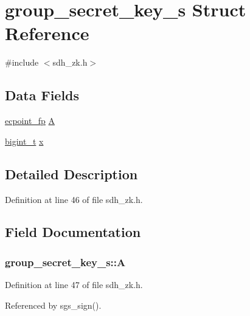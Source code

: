\hypertarget{structgroup__secret__key__s}{\section{group\-\_\-secret\-\_\-key\-\_\-s Struct Reference}
\label{structgroup__secret__key__s}
}


{\ttfamily \#include $<$sdh\-\_\-zk.\-h$>$}

\subsection*{Data Fields}
\begin{DoxyCompactItemize}
\item 
\hyperlink{structecpoint__fp}{ecpoint\-\_\-fp} \hyperlink{structgroup__secret__key__s_aca70ac18f7fc659b13b3f2d2ee66cb62}{A}
\item 
\hyperlink{types_8h_a7ae8816fa287bc4a98dec462acd2ad28}{bigint\-\_\-t} \hyperlink{structgroup__secret__key__s_a1c239f9d6501e2f14a42f7ecc56cbc1b}{x}
\end{DoxyCompactItemize}


\subsection{Detailed Description}


Definition at line 46 of file sdh\-\_\-zk.\-h.



\subsection{Field Documentation}
\hypertarget{structgroup__secret__key__s_aca70ac18f7fc659b13b3f2d2ee66cb62}{
\subsubsection[{A}]{ group\-\_\-secret\-\_\-key\-\_\-s\-::\-A}}\label{structgroup__secret__key__s_aca70ac18f7fc659b13b3f2d2ee66cb62}


Definition at line 47 of file sdh\-\_\-zk.\-h.



Referenced by sgs\-\_\-sign().

